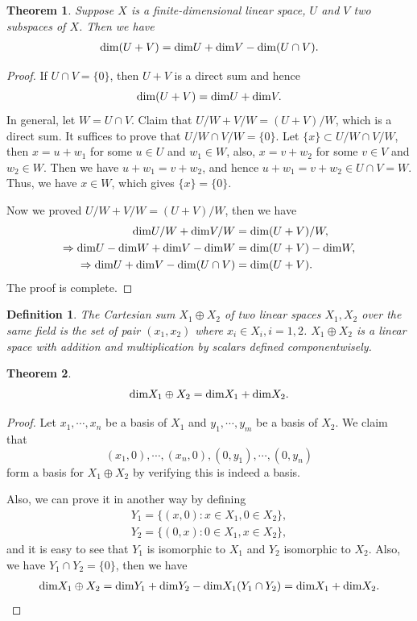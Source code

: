 \documentclass[11pt]{book}
\newtheorem{definition}{Definition}[chapter]
\newtheorem{theorem}{Theorem}[chapter]
\theoremstyle{definition}
\numberwithin{equation}{chapter}
\begin{document}
\medskip

\begin{theorem}
Suppose $X$ is a finite-dimensional linear space, $U$ and $V$ two subspaces of $X$. Then we have
\begin{align*}
    {\rm dim}(U+V) = {\rm dim}U + {\rm dim}V - {\rm dim}(U\cap V).
\end{align*}
\end{theorem}
\begin{proof}
If $U\cap V = \{0\}$, then $U+V$ is a direct sum and hence 
$${\rm dim}(U+V) = {\rm dim}U + {\rm dim}V.$$
In general, let $W = U\cap V$. Claim that $U/W+V/W = (U+V)/W$, which is a direct sum. It suffices to prove that $U/W\cap V/W = \{0\}$. Let $\{x\}\subset U/W\cap V/W$, then $x = u+w_1$ for some $u\in U$ and $w_1\in W$, also, $x = v+w_2$ for some $v\in V$ and $w_2\in W$. Then we have $u+w_1 = v+w_2$, and hence $u+w_1 = v+w_2\in U\cap V = W$. Thus, we have $x\in W$, which gives $\{x\} = \{0\}$.

Now we proved $U/W+V/W = (U+V)/W$, then we have 
\begin{align*}
    {\rm dim}U/W + {\rm dim}V/W & = {\rm dim}(U+V)/W,\\
    \Rightarrow {\rm dim}U - {\rm dim} W + {\rm dim} V - {\rm dim}W & = {\rm dim}(U+V) - {\rm dim}W,\\ 
    \Rightarrow {\rm dim}U + {\rm dim} V - {\rm dim}(U\cap V) & = {\rm dim}(U+V).
\end{align*}
The proof is complete.
\end{proof}

\medskip

\begin{definition}
The Cartesian sum $X_1\oplus X_2$ of two linear spaces $X_1, X_2$ over the same field is the set of pair $(x_1,x_2)$ where $x_i\in X_i, i = 1,2$. $X_1\oplus X_2$ is a linear space with addition and multiplication by scalars defined componentwisely. 
\end{definition}

\medskip

\begin{theorem}
$${\rm dim}X_1\oplus X_2 = {\rm dim}X_1 + {\rm dim}X_2.$$
\end{theorem}
\begin{proof}
Let $x_1, \cdots, x_n$ be a basis of $X_1$ and $y_1, \cdots, y_m$ be a basis of $X_2$. We claim that 
$$(x_1,0),\cdots, (x_n,0), (0,y_1), \cdots, (0,y_n)$$ 
form a basis for $X_1\oplus X_2$ by verifying this is indeed a basis.

Also, we can prove it in another way by defining
\begin{align*}
    Y_1 = \{(x,0): x\in X_1, 0\in X_2\}, \\
    Y_2 = \{(0,x): 0\in X_1, x\in X_2\},
\end{align*}
and it is easy to see that $Y_1$ is isomorphic to $X_1$ and $Y_2$ isomorphic to $X_2$. Also, we have $Y_1\cap Y_2 = \{0\}$, then we have 
\begin{align*}
    {\rm dim}X_1\oplus X_2 = {\rm dim}Y_1 + {\rm dim}Y_2 - {\rm dim}X_1(Y_1\cap Y_2) = {\rm dim}X_1 + {\rm dim}X_2.
\end{align*}
\end{proof}
\end{document}
